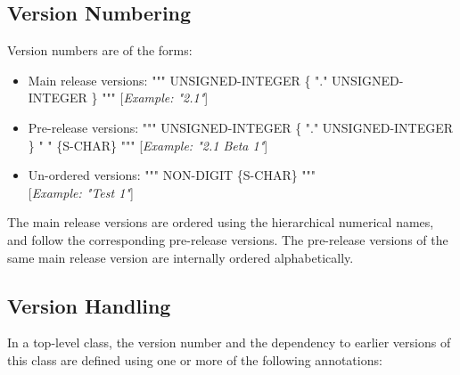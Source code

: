 \subsection{Version Numbering}

Version numbers are of the forms:

\begin{itemize}
\item
  Main release versions: """ UNSIGNED-INTEGER \{ "." UNSIGNED-INTEGER \}
  """ {[}\emph{Example: "2.1"}{]}
\item
  Pre-release versions: """ UNSIGNED-INTEGER \{ "." UNSIGNED-INTEGER \}
  " " \{S-CHAR\} """ {[}\emph{Example: "2.1 Beta 1"}{]}
\item
  Un-ordered versions: """ NON-DIGIT \{S-CHAR\} """\\
  {[}\emph{Example: "Test 1"}{]}
\end{itemize}

The main release versions are ordered using the hierarchical numerical
names, and follow the corresponding pre-release versions. The
pre-release versions of the same main release version are internally
ordered alphabetically.

\subsection{Version Handling}

In a top-level class, the version number and the dependency to earlier
versions of this class are defined using one or more of the following
annotations:

